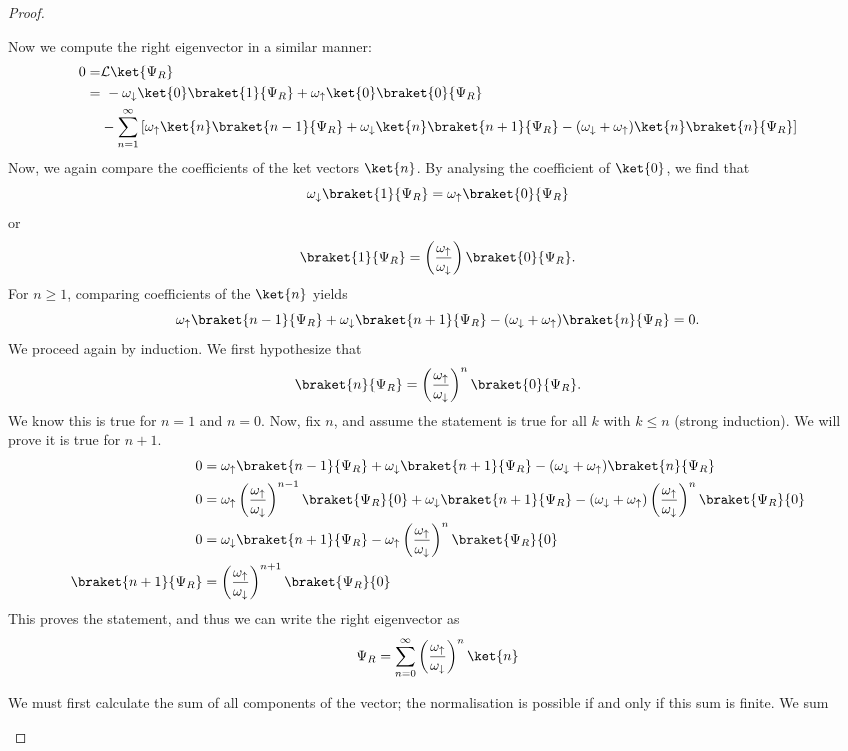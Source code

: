 \begin{proof}
\begin{parts}
		Now we compute the right eigenvector in a similar manner:
		\begin{align*}
			0 =& \mathcal{L}\ket{\Psi_R} \\
			=&~-\omega_\downarrow\ket{0}\braket{1}{\Psi_R} + \omega_\uparrow \ket{0}\braket{0}{\Psi_R}\\
			 &-\sum_{n=1}^{\infty} \left[ \omega_\uparrow\ket{n}\braket{n-1}{\Psi_R}+\omega_\downarrow \ket{n}\braket{n+1}{\Psi_R}-(\omega_\downarrow+\omega_\uparrow)\ket{n}\braket{n}{\Psi_R} \right] 
		\end{align*}
		Now, we again compare the coefficients of the ket vectors $\ket{n}$. By analysing the coefficient of $\ket{0}$, we find that
		\[
			\omega_\downarrow \braket{1}{\Psi_R} = \omega_\uparrow \braket{0}{\Psi_R}
		\] 
		or
		\[
			\braket{1}{\Psi_R} = \left( \frac{\omega_\uparrow}{\omega_\downarrow} \right) \braket{0}{\Psi_R}
		.\] 
		For $n\ge 1$, comparing coefficients of the $\ket{n}$ yields
		\[
			\omega_\uparrow \braket{n-1}{\Psi_R} +\omega_\downarrow \braket{n+1}{\Psi_R}-(\omega_\downarrow + \omega_\uparrow)\braket{n}{\Psi_R}=0
		.\] 
		We proceed again by induction. We first hypothesize that
		\[
			\braket{n}{\Psi_R} = \left( \frac{\omega_\uparrow}{\omega_\downarrow} \right)^n \braket{0}{\Psi_R} 
		.\] 
		We know this is true for $n=1$ and $n=0$. Now, fix $n$, and assume the statement is true for all $k$ with $k\le n$ (strong induction). We will prove it is true for $n+1$. 
		\begin{align*}
			0&=\omega_\uparrow \braket{n-1}{\Psi_R} +\omega_\downarrow \braket{n+1}{\Psi_R}-(\omega_\downarrow + \omega_\uparrow)\braket{n}{\Psi_R}\\
			0&=\omega_\uparrow \left( \frac{\omega_\uparrow}{\omega_\downarrow} \right)^{n-1}\braket{\Psi_R}{0} +\omega_\downarrow \braket{n+1}{\Psi_R}-(\omega_\downarrow + \omega_\uparrow)\left( \frac{\omega_\uparrow}{\omega_\downarrow} \right)^n \braket{\Psi_R}{0} \\
0&=\omega_\downarrow \braket{n+1}{\Psi_R}- \omega_\uparrow\left( \frac{\omega_\uparrow}{\omega_\downarrow} \right)^n \braket{\Psi_R}{0} \\
\braket{n+1}{\Psi_R}&= \left( \frac{\omega_\uparrow}{\omega_\downarrow} \right)^{n+1} \braket{\Psi_R}{0}
		\end{align*}
		This proves the statement, and thus we can write the right eigenvector as
		\[\Psi_R = \sum_{n=0}^\infty\left( \frac{\omega_\uparrow}{\omega_\downarrow} \right)^n\ket{n} \]
	\item We must first calculate the sum of all components of the vector; the normalisation is possible if and only if this sum is finite. We sum

\end{parts}
\end{proof}
